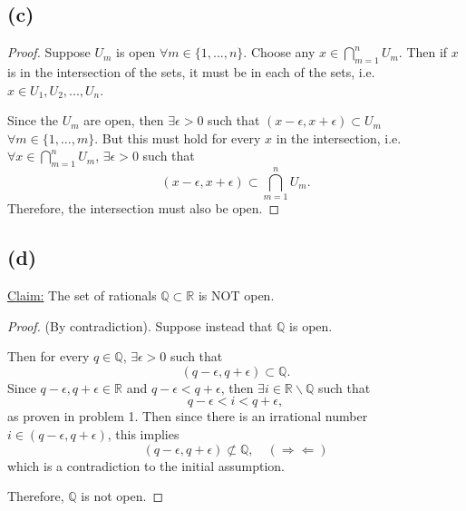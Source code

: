 \documentclass{article}
\begin{document}
\subsection*{(c)}
\begin{proof}
	Suppose $U_m$ is open $\forall m \in \{1, ..., n\}$. Choose any $x\in\bigcap_{m=1}^{n}U_m$. Then if $x$ is in the intersection of the sets, it must be in each of the sets, i.e. \\$x\in U_1, U_2, ..., U_n$.
	
	Since the $U_m$ are open, then $\exists \epsilon>0$ such that $(x-\epsilon, x+\epsilon)\subset U_m$ $\forall m \in \{1, ..., m\}$. But this must hold for every $x$ in the intersection, i.e. $\forall x \in \bigcap_{m=1}^n U_m$, $\exists \epsilon>0$ such that
	\begin{equation}
		(x-\epsilon, x+\epsilon)\subset \bigcap_{m=1}^{n} U_m.
	\end{equation}  
	Therefore, the intersection must also be open. 
\end{proof}

\subsection*{(d)}
\underline{Claim:} The set of rationals $\mathbb{Q} \subset \mathbb{R}$ is NOT open.
\begin{proof}
	(By contradiction). Suppose instead that $\mathbb{Q}$ is open. 
	
	Then for every $q \in \mathbb{Q}$, $\exists \epsilon>0$ such that
	\begin{equation}
		(q-\epsilon, q+\epsilon) \subset \mathbb{Q}.
	\end{equation}
	Since $q-\epsilon, q+\epsilon \in \mathbb{R}$ and $q-\epsilon < q+\epsilon$, then $\exists i \in \mathbb{R} \backslash \mathbb{Q}$ such that 
	\begin{equation}
		q-\epsilon<i<q+\epsilon,
	\end{equation}
	as proven in problem 1. Then since there is an irrational number $i \in (q-\epsilon, q+\epsilon)$, this implies 
	\begin{equation}
		(q-\epsilon, q+\epsilon) \not\subset \mathbb{Q}, \quad (\Rightarrow \Leftarrow)
	\end{equation}
	which is a contradiction to the initial assumption. 
	
	Therefore, $\mathbb{Q}$ is not open. 
\end{proof}
\end{document}
